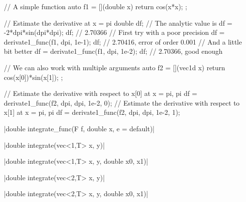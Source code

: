 \begin{example}
\begin{cppcode}
// A simple function
auto f1 = [](double x) {
    return cos(x*x);
};

// Estimate the derivative at x = pi
double df;
// The analytic value is
df = -2*dpi*sin(dpi*dpi);
df; // 2.70366
// First try with a poor precision
df = derivate1_func(f1, dpi, 1e-1);
df; // 2.70416, error of order 0.001
// And a little bit better
df = derivate1_func(f1, dpi, 1e-2);
df; // 2.70366, good enough

// We can also work with multiple arguments
auto f2 = [](vec1d x) {
    return cos(x[0])*sin(x[1]);
};

// Estimate the derivative with respect to x[0] at x = {pi, pi}
df = derivate1_func(f2, {dpi, dpi}, 1e-2, 0);
// Estimate the derivative with respect to x[1] at x = {pi, pi}
df = derivate1_func(f2, {dpi, dpi}, 1e-2, 1);
\end{cppcode}
\end{example}

\funcitem \cppinline|double integrate_func(F f, double x, e = default)| 

\funcitem \cppinline|double integrate(vec<1,T> x, y)| 

\cppinline|double integrate(vec<1,T> x, y, double x0, x1)|

\cppinline|double integrate(vec<2,T> x, y)|

\cppinline|double integrate(vec<2,T> x, y, double x0, x1)|

